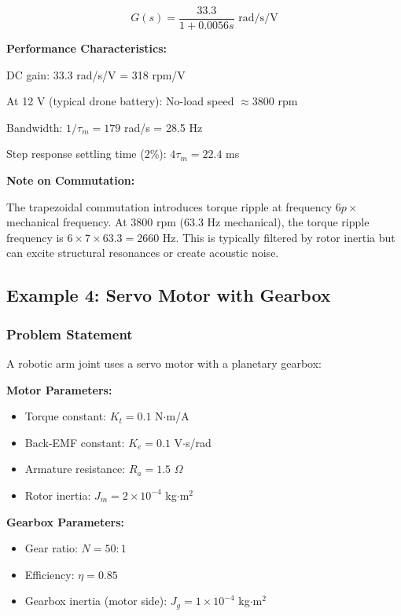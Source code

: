 \begin{equation}
    \boxed{G(s) = \frac{33.3}{1 + 0.0056s} \text{ rad/s/V}}
\end{equation}

\textbf{Performance Characteristics:}

DC gain: 33.3 rad/s/V = 318 rpm/V

At 12 V (typical drone battery): No-load speed $\approx 3800$ rpm

Bandwidth: $1/\tau_m = 179$ rad/s = 28.5 Hz

Step response settling time (2\%): $4\tau_m = 22.4$ ms

\textbf{Note on Commutation:}

The trapezoidal commutation introduces torque ripple at frequency $6p \times$ mechanical frequency. At 3800 rpm (63.3 Hz mechanical), the torque ripple frequency is $6 \times 7 \times 63.3 = 2660$ Hz. This is typically filtered by rotor inertia but can excite structural resonances or create acoustic noise.

\subsection{Example 4: Servo Motor with Gearbox}

\subsubsection{Problem Statement}

A robotic arm joint uses a servo motor with a planetary gearbox:

\textbf{Motor Parameters:}
\begin{itemize}
    \item Torque constant: $K_t = 0.1$ N$\cdot$m/A
    \item Back-EMF constant: $K_e = 0.1$ V$\cdot$s/rad
    \item Armature resistance: $R_a = 1.5$ $\Omega$
    \item Rotor inertia: $J_m = 2 \times 10^{-4}$ kg$\cdot$m$^2$
\end{itemize}

\textbf{Gearbox Parameters:}
\begin{itemize}
    \item Gear ratio: $N = 50:1$
    \item Efficiency: $\eta = 0.85$
    \item Gearbox inertia (motor side): $J_g = 1 \times 10^{-4}$ kg$\cdot$m$^2$
\end{itemize}

